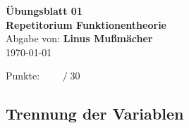 \documentclass{article}
\def\sheetNumber{01}
\def\names{Linus Mußmächer}
\def\sumPoints{30}
\begin{document}
\begin{doublespace}
	\begin{center}
		\textbf{\Large{Übungsblatt \sheetNumber}}\\
		\textbf{\Large{Repetitorium Funktionentheorie}}\\
		Abgabe von: \textbf{\names}\\
		\today
	\end{center}
	\hfill  {\large Punkte: $\boxed{\qquad  /\; \sumPoints}$}\\
\end{doublespace}




\subsection{Trennung der Variablen}
\end{document}
